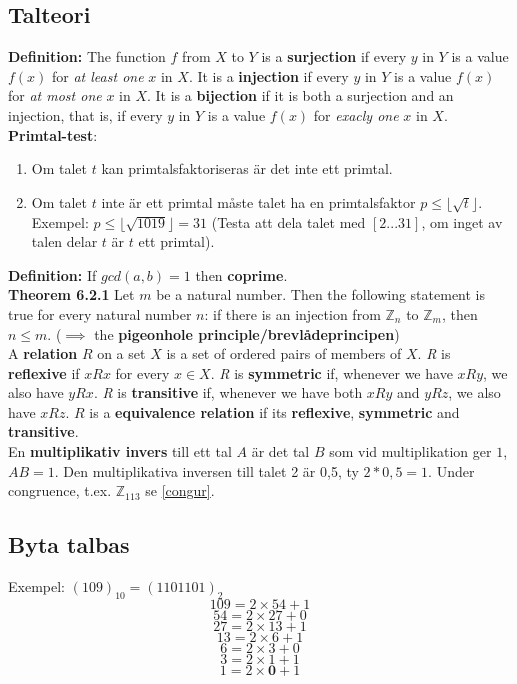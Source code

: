 \documentclass{article}
\begin{document}
\begin{multicols}{2}
\section{Talteori}
\textbf{Definition:} The function $f$ from $X$ to $Y$ is a \textbf{surjection} if every $y$ in $Y$ is a value $f(x)$ for \textit{at least one} $x$ in $X$. It is a \textbf{injection} if every $y$ in $Y$ is a value $f(x)$ for \textit{at most one} $x$ in $X$. It is a \textbf{bijection} if it is both a surjection and an injection, that is, if every $y$ in $Y$ is a value $f(x)$ for \textit{exacly one} $x$ in $X$.\\
\newline
\textbf{Primtal-test}:
\begin{enumerate}
    \item Om talet $t$ kan primtalsfaktoriseras är det inte ett primtal.
    \item Om talet $t$ inte är ett primtal måste talet ha en primtalsfaktor $p \leq \lfloor \sqrt{t} \rfloor$. Exempel: $p \leq \lfloor \sqrt{1019} \rfloor = 31$ (Testa att dela talet med $[2... 31]$, om inget av talen delar $t$ är $t$ ett primtal).
\end{enumerate}
\newline
\textbf{Definition:} If $gcd(a,b) = 1$ then \textbf{coprime}.\\
\newline
\textbf{Theorem 6.2.1}
Let $m$ be a natural number. Then the following statement is true for every natural number $n$: if there is an injection from $\mathbb{Z}_n$ to $\mathbb{Z}_m$, then $n\leq m$. ($\implies$ the \textbf{pigeonhole principle/brevlådeprincipen})\\
\newline
A \textbf{relation} $R$ on a set $X$ is a set of ordered pairs of members of $X$. \textit{R} is \textbf{reflexive} if $xRx$ for every $x \in X$. \textit{R} is \textbf{symmetric} if, whenever we have $xRy$, we also have $yRx$. \textit{R} is \textbf{transitive} if, whenever we have both $xRy$ and $yRz$, we also have $xRz$. $R$ is a \textbf{equivalence relation} if its \textbf{reflexive}, \textbf{symmetric} and \textbf{transitive}.\\
\newline
En \textbf{multiplikativ invers} till ett tal $A$ är det tal $B$ som vid multiplikation ger $1$, $AB=1$. Den multiplikativa inversen till talet 2 är 0,5, ty $2*0,5=1$. Under congruence, t.ex. $\mathbb{Z}_{113}$ se \ref{congur}.


\subsection{Byta talbas}
\begin{multicols}{2}
Exempel: $(109)_{10} = (1101101)_2$
$$109 = 2 \times 54 + 1$$
$$54 = 2 \times 27 + 0$$
$$27 = 2 \times 13 + 1$$
$$13 = 2 \times 6 + 1$$
$$6 = 2 \times 3 + 0$$
$$3 = 2 \times 1 + 1$$
$$1 = 2 \times \textbf{0} + 1$$
\end{multicols}



\end{multicols}
\end{document}
